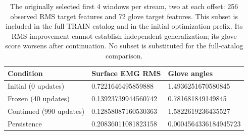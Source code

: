 \begin{table}[htbp]
\centering
\setlength{\tabcolsep}{3pt}
\begin{tabular}{p{.29\linewidth}p{.32\linewidth}p{.32\linewidth}}
Condition & Surface EMG RMS & Glove angles\\\hline
Initial (0 updates) & 0.7221646495859888 & 1.4936251670580845\\
Frozen (40 updates) & 0.13923739944560742 & 0.781681849149845\\
Continued (990 updates) & 0.12858087160530363 & 1.5822619236435527\\
Persistence & 0.20836011081823158 & 0.0004564336184945723\\
\hline
\end{tabular}
\caption{The originally selected first 4 windows per stream, two at each offset: 256 observed RMS target features and 72 glove target features. This subset is included in the full TRAIN catalog and in the initial optimization prefix. Its RMS improvement cannot establish independent generalization; its glove score worsens after continuation. No subset is substituted for the full-catalog comparison.\cite{movementTrain990Recorded2026}}
\label{tab:self-forecast-prefix}
\end{table}
